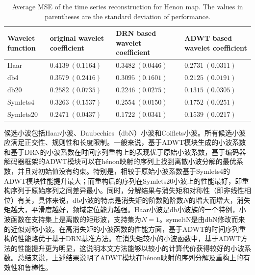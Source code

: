 \begin{table}[!ht]
\fontsize{8}{12}\selectfont
\centering
\caption{Average MSE of the time series reconstruction for Henon map. The values in parentheses are the standard deviation of performance.}
\begin{tabular}{llll}
 \hline
  Wavelet function & original wavelet coefficient&  DRN based wavelet coefficient &  ADWT based wavelet coefficient \\
  \hline
  Haar & $0.4139\ (0.1164)$ & $0.3482\ (0.0446)$& $0.2731\ (0.0311)$ \\
  \hline
  db4 & $0.3579\ (0.2416)$ & $0.3095\ (0.1601)$& $0.2125\ (0.0191)$\\
  \hline
  db20 & $0.2582\ (0.0735)$ & $0.2246\ (0.0275)$& $0.1315\ (0.0305)$\\
  \hline
  Symlets4  & $0.3263\ (0.1537)$ & $0.2554\ (0.0150)$& $0.1752\ (0.0251)$\\
  \hline
  Symlets20  & $0.2471\ (0.0437)$ & $0.1722\ (0.0341)$& $0.1539\ (0.0217)$\\
  \hline
\end{tabular}
\label{table1}
\end{table}

候选小波包括Haar小波、Daubechies（dbN）小波和Coiflets小波。所有候选小波应满足正交性、规则性和长度限制。一般来说，基于ADWT模块生成的小波系数和基于DRN的小波系数在时间序列重构上的表现优于原始小波系数，基于编码器-解码器框架的ADWT模块可以在h\'{e}non映射的序列上找到离散小波分解的最优系数，并且对初始值没有约束。特别是，相较于原始小波系数基于Symlets4的ADWT模块性能提升最大；而重构后的序列在Symlets20小波上的性能最好，即重构序列于原始序列之间差异最小。同时，分解结果与消失矩和对称性（即非线性相位）有关，具体来说，db小波的特点是消失矩的阶数随阶数$N$的增大而增大，消失矩越大，平滑度越好，频域定位能力越强。Haar小波是db小波族的一个特例，小波函数在支持集上是离散的矩形波，支持集为$N=1$。symeltN是由dbN修改而来的近似对称小波。在高消失矩的小波函数的性能方面，基于ADWT的时间序列重构的性能略优于基于DRN基准方法。在消失矩较小的小波函数中，基于ADWT方法的性能提升更为明显，这说明本文方法能够以较小的计算代价获得较好的小波系数。总结来说，上述结果说明了ADWT模块在h\'{e}non映射的序列分解及重构上的有效性和鲁棒性。

